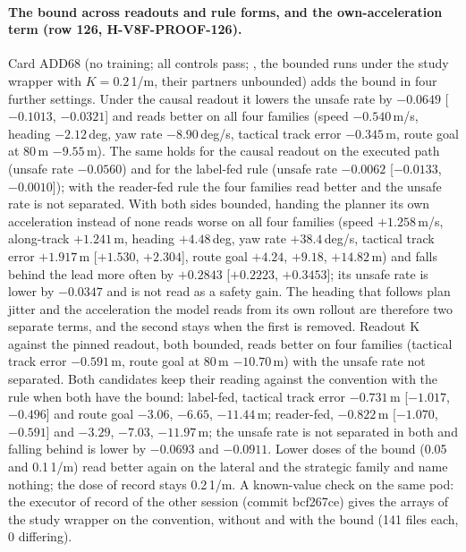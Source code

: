\paragraph{The bound across readouts and rule forms, and the own-acceleration term (row 126, H-V8F-PROOF-126).} Card ADD68 (no training; all controls pass; , the bounded runs under the study wrapper with $K=0.2$\,1/m, their partners unbounded) adds the bound in four further settings. Under the causal readout it lowers the unsafe rate by $-0.0649$ [$-0.1013$, $-0.0321$] and reads better on all four families (speed $-0.540$\,m/s, heading $-2.12$\,deg, yaw rate $-8.90$\,deg/s, tactical track error $-0.345$\,m, route goal at 80\,m $-9.55$\,m). The same holds for the causal readout on the executed path (unsafe rate $-0.0560$) and for the label-fed rule (unsafe rate $-0.0062$ [$-0.0133$, $-0.0010$]); with the reader-fed rule the four families read better and the unsafe rate is not separated. With both sides bounded, handing the planner its own acceleration instead of none reads worse on all four families (speed $+1.258$\,m/s, along-track $+1.241$\,m, heading $+4.48$\,deg, yaw rate $+38.4$\,deg/s, tactical track error $+1.917$\,m [$+1.530$, $+2.304$], route goal $+4.24$, $+9.18$, $+14.82$\,m) and falls behind the lead more often by $+0.2843$ [$+0.2223$, $+0.3453$]; its unsafe rate is lower by $-0.0347$ and is not read as a safety gain. The heading that follows plan jitter and the acceleration the model reads from its own rollout are therefore two separate terms, and the second stays when the first is removed. Readout K against the pinned readout, both bounded, reads better on four families (tactical track error $-0.591$\,m, route goal at 80\,m $-10.70$\,m) with the unsafe rate not separated. Both candidates keep their reading against the convention with the rule when both have the bound: label-fed, tactical track error $-0.731$\,m [$-1.017$, $-0.496$] and route goal $-3.06$, $-6.65$, $-11.44$\,m; reader-fed, $-0.822$\,m [$-1.070$, $-0.591$] and $-3.29$, $-7.03$, $-11.97$\,m; the unsafe rate is not separated in both and falling behind is lower by $-0.0693$ and $-0.0911$. Lower doses of the bound (0.05 and 0.1\,1/m) read better again on the lateral and the strategic family and name nothing; the dose of record stays 0.2\,1/m. A known-value check on the same pod: the executor of record of the other session (commit bcf267ce) gives the arrays of the study wrapper on the convention, without and with the bound (141 files each, 0 differing).

